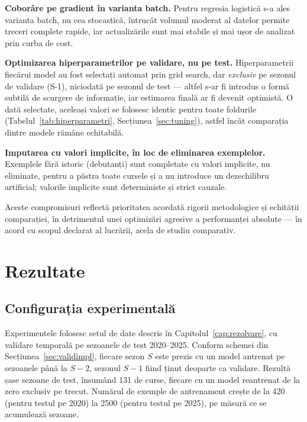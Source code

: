 \documentclass[12pt,a4paper]{report}
\begin{document}
\textbf{Coborâre pe gradient în varianta batch.} Pentru regresia logistică s-a ales varianta batch,
nu cea stocastică, întrucât volumul moderat al datelor permite treceri complete rapide, iar
actualizările sunt mai stabile și mai ușor de analizat prin curba de cost.

\textbf{Optimizarea hiperparametrilor pe validare, nu pe test.} Hiperparametrii fiecărui model au
fost selectați automat prin grid search, dar \emph{exclusiv} pe sezonul de validare (S-1), niciodată
pe sezonul de test --- altfel s-ar fi introdus o formă subtilă de scurgere de informație, iar
estimarea finală ar fi devenit optimistă. O dată selectate, aceleași valori se folosesc identic
pentru toate foldurile (Tabelul~\ref{tab:hiperparametri}, Secțiunea~\ref{sec:tuning}), astfel încât
comparația dintre modele rămâne echitabilă.

\textbf{Imputarea cu valori implicite, în loc de eliminarea exemplelor.} Exemplele fără istoric
(debutanți) sunt completate cu valori implicite, nu eliminate, pentru a păstra toate cursele și a
nu introduce un dezechilibru artificial; valorile implicite sunt deterministe și strict cauzale.

Aceste compromisuri reflectă prioritatea acordată rigorii metodologice și echității comparației,
în detrimentul unei optimizări agresive a performanței absolute --- în acord cu scopul declarat al
lucrării, acela de studiu comparativ.

\chapter{Rezultate}
\label{cap:rezultate}

\section{Configurația experimentală}

Experimentele folosesc setul de date descris în Capitolul~\ref{cap:rezolvare}, cu validare
temporală pe sezoanele de test 2020--2025. Conform schemei din Secțiunea~\ref{sec:validimpl},
fiecare sezon $S$ este prezis cu un model antrenat pe sezoanele până la $S-2$, sezonul $S-1$ fiind
ținut deoparte ca validare. Rezultă șase sezoane de test, însumând 131 de curse, fiecare cu un
model reantrenat de la zero exclusiv pe trecut. Numărul de exemple de antrenament crește de la 420
(pentru testul pe 2020) la 2500 (pentru testul pe 2025), pe măsură ce se acumulează sezoane.
\end{document}
